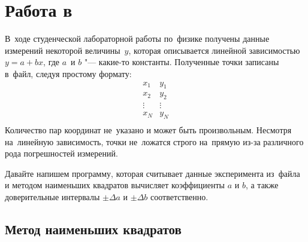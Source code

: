 
\chapter{Работа в }\label{chap:ide}
В~ходе студенческой лабораторной работы по~физике получены данные измерений некоторой величины~\(y\), которая описывается линейной зависимостью \(y = a + bx\), где \(a\)~и \(b\) "--- какие-то константы. Полученные точки записаны в~файл, следуя простому формату:
\[
\begin{array}{ll}
    x_1 & y_1 \\
    x_2 & y_2 \\
    \vdots & \vdots \\
    x_N & y_N \\
\end{array}
\]
Количество пар координат не~указано и может быть произвольным. Несмотря на~линейную зависимость, точки не~ложатся строго на~прямую из-за различного рода погрешностей измерений.

Давайте напишем программу, которая считывает данные эксперимента из~файла и методом наименьших квадратов вычисляет коэффициенты \(a\) и \(b\), а также доверительные интервалы \(\pm\Delta a\) и \(\pm\Delta b\) соответственно.



\section{Метод наименьших квадратов}\label{sect:leastsquares}


